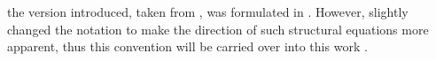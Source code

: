 \documentclass[11pt,a4paper]{book}
\theoremstyle{definition}
\theoremstyle{definition}
\newtheorem{example}{Example}[section]
\theoremstyle{definition}
\theoremstyle{remark}
\begin{document}
the version introduced, taken from \parencite{halpern2015cause}, was formulated in \cite{halpern2000axiomatizing}. However, \parencite{Weslake2015partial} slightly changed the notation to make the direction of such structural equations more apparent, thus this convention will be carried over into this work \parencite{halpern2015cause,Weslake2015partial}. 
%
%
%
%
%
%
% 
%
%
%
%
%
%
\end{document}
